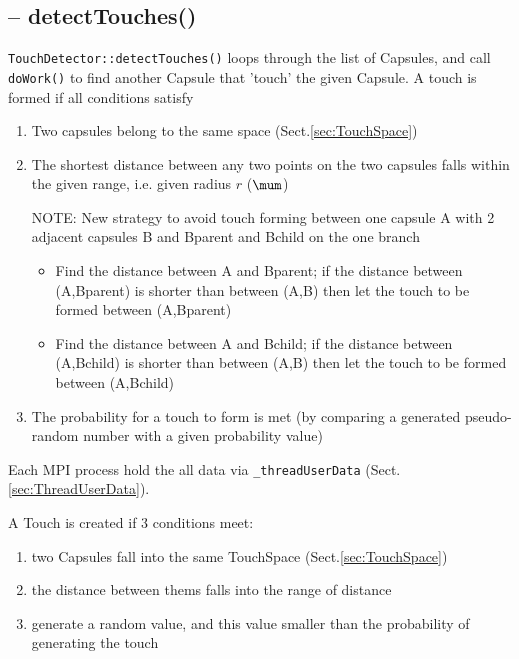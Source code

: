 \subsection{-- detectTouches()}
\label{sec:detectTouches()}

\verb!TouchDetector::detectTouches()! loops through the list of Capsules, and
call \verb!doWork()! to find another Capsule that 'touch' the given Capsule.
A touch is formed if all conditions satisfy
\begin{enumerate}
  \item Two capsules belong to the same space (Sect.\ref{sec:TouchSpace})
  
  \item The shortest distance between any two points on the two capsules falls
  within the given range, i.e. given radius $r$ ($\mum$)

NOTE: New strategy to avoid touch forming between one capsule A with 2 adjacent
capsules B and Bparent and Bchild on the one branch
\begin{itemize}
  \item Find the distance between A and Bparent; if the distance between
  (A,Bparent) is shorter than between (A,B) then let the touch to be formed
  between (A,Bparent)
  
  \item Find the distance between A and Bchild; if the distance between
  (A,Bchild) is shorter than between (A,B) then let the touch to be formed between (A,Bchild)
\end{itemize}

  \item The probability for a touch to form is met (by comparing a generated
  pseudo-random number with a given probability value)
\end{enumerate}


Each MPI process hold the all data via \verb!_threadUserData!
(Sect.\ref{sec:ThreadUserData}).

A Touch is created if 3 conditions meet:
\begin{enumerate}
  \item two Capsules fall into the same TouchSpace (Sect.\ref{sec:TouchSpace})
  \item the distance between thems falls into the range of distance
  \item generate a random value, and this value smaller than the probability
  of generating the touch
\end{enumerate}


